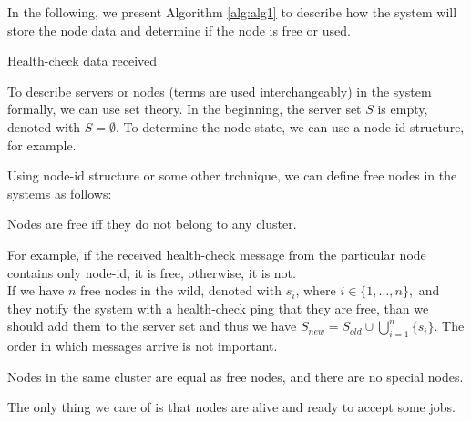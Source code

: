 In the following, we present Algorithm \ref{alg:alg1} to describe how the system will store the node data and determine if the node is free or used.

\begin{algorithm}[H]
	\SetAlgoLined
	\caption{Health-check data received}
	\label{alg:alg1}
\end{algorithm}

To describe servers or nodes (terms are used interchangeably) in the system formally, we can use set theory. In the beginning, the server set $S$ is empty, denoted with $S=\emptyset$. To determine the node state, we can use a node-id structure, for example. 

Using node-id structure or some other trchnique, we can define free nodes in the systems as follows:

\begin{definition}
	Nodes are free iff they do not belong to any cluster.
\end{definition}

\noindent 
For example, if the received health-check message from the particular node contains only node-id, it is free, otherwise, it is not.\\ 

If we have $n$ free nodes in the wild, denoted with $s_i$, where $i\in\{1, \ldots, n\},$ and they notify the system with a health-check ping that they are free, than we should add them to the server set and thus we have 
$S_{\mathit{new}} = S_{\mathit{old}} \cup \bigcup%
_{i=1}^{n} \{s_i\}$. 
The order in which messages arrive is not important. 

\begin{definition}
Nodes in the same cluster are equal as free nodes, and there are no special nodes. 
\end{definition}

\noindent
The only thing we care of is that nodes are alive and ready to accept some jobs. \\

